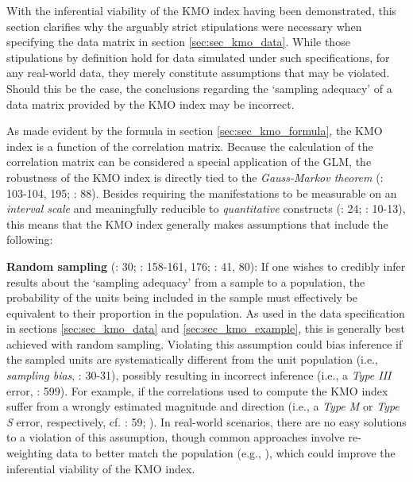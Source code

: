 \documentclass[
  10pt,
  a4paper,
  twoside]{article}
\begin{document}
With the inferential viability of the KMO index having been demonstrated, this section clarifies why the arguably strict stipulations were necessary when specifying the data matrix in section \ref{sec:sec_kmo_data}. While those stipulations by definition hold for data simulated under such specifications, for any real-world data, they merely constitute assumptions that may be violated. Should this be the case, the conclusions regarding the `sampling adequacy' of a data matrix provided by the KMO index may be incorrect.

As made evident by the formula in section \ref{sec:sec_kmo_formula}, the KMO index is a function of the correlation matrix. Because the calculation of the correlation matrix can be considered a special application of the GLM, the robustness of the KMO index is directly tied to the \emph{Gauss-Markov theorem} (: 103-104, 195; : 88). Besides requiring the manifestations to be measurable on an \emph{interval scale} and meaningfully reducible to \emph{quantitative} constructs (: 24; : 10-13), this means that the KMO index generally makes assumptions that include the following:

\textbf{Random sampling} (: 30; : 158-161, 176; : 41, 80): If one wishes to credibly infer results about the `sampling adequacy' from a sample to a population, the probability of the units being included in the sample must effectively be equivalent to their proportion in the population. As used in the data specification in sections \ref{sec:sec_kmo_data} and \ref{sec:sec_kmo_example}, this is generally best achieved with random sampling. Violating this assumption could bias inference if the sampled units are systematically different from the unit population (i.e., \emph{sampling bias}, : 30-31), possibly resulting in incorrect inference (i.e., a \emph{Type III} error, : 599). For example, if the correlations used to compute the KMO index suffer from a wrongly estimated magnitude and direction (i.e., a \emph{Type M} or \emph{Type S} error, respectively, cf. : 59; ). In real-world scenarios, there are no easy solutions to a violation of this assumption, though common approaches involve re-weighting data to better match the population (e.g., ), which could improve the inferential viability of the KMO index.
\end{document}
